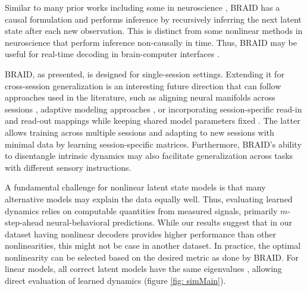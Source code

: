 \documentclass{article} %
\newcommand{\ourmethod}{BRAID}
\begin{document}
Similar to many prior works including some in neuroscience  \citep{abbaspourazad2024dynamical,sani2024dissociative,chung2015recurrent, krishnan2015deepkalmanfilters, fraccaro2016sequential, luk2024learningoptimalfiltersusing}, \ourmethod{} has a causal formulation and performs inference by recursively inferring the next latent state after each new observation. This is distinct from some nonlinear methods in neuroscience \citep{gao2016linear, pandarinath2018inferring, hernandez2020, hurwitz2021targeted, keshtkaran2022large, gondur2024multi, karniolmodeling} that perform inference non-causally in time. Thus, \ourmethod{} may be useful for real-time decoding in brain-computer interfaces \citep{shanechi2019brain}. 

\ourmethod{}, as presented, is designed for single-session settings. Extending it for cross-session generalization is an interesting future direction that can follow approaches used in the literature, such as aligning neural manifolds across sessions \citep{farshchian2018adversarial}, adaptive modeling approaches \citep{Ahmadipour_2021, Yang_2021}, or incorporating session-specific read-in and read-out mappings while keeping shared model parameters fixed \citep{pandarinath2018inferring}. The latter allows training across multiple sessions and adapting to new sessions with minimal data by learning session-specific matrices. Furthermore, \ourmethod{}'s ability to disentangle intrinsic dynamics may also facilitate generalization across tasks with different sensory instructions.

A fundamental challenge for nonlinear latent state models is that many alternative models may explain the data equally well. Thus, evaluating learned dynamics relies on computable quantities from measured signals, primarily $m$-step-ahead neural-behavioral predictions. While our results suggest that in our dataset having nonlinear decoders provides higher performance than other nonlinearities, this might not be case in another dataset. In practice, the optimal nonlinearity can be selected based on the desired metric as done by \ourmethod{}. For linear models, all correct latent models have the same eigenvalues \citep{katayama2006subspace}, allowing direct evaluation of learned dynamics (figure \ref{fig: simMain}).
\end{document}
